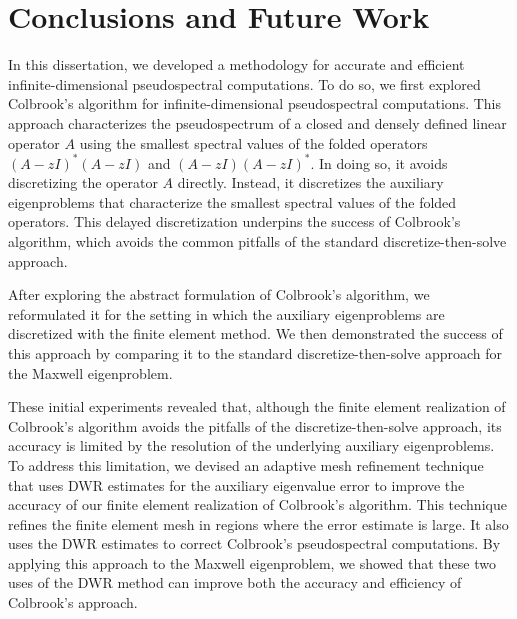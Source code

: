 \chapter{Conclusions and Future Work}


In this dissertation, we developed a methodology for accurate and efficient infinite-dimensional pseudospectral computations. To do so, we first explored Colbrook's algorithm for infinite-dimensional pseudospectral computations. This approach characterizes the pseudospectrum of a closed and densely defined linear operator $A$ using the smallest spectral values of the folded operators $(A-zI)^*(A-zI)$ and $(A-zI)(A-zI)^*.$ In doing so, it avoids discretizing the operator $A$ directly. Instead, it discretizes the auxiliary eigenproblems that characterize the smallest spectral values of the folded operators. This delayed discretization underpins the success of Colbrook's algorithm, which avoids the common pitfalls of the standard discretize-then-solve approach.

After exploring the abstract formulation of Colbrook's algorithm, we reformulated it for the setting in which the auxiliary eigenproblems are discretized with the finite element method. We then demonstrated the success of this approach by comparing it to the standard discretize-then-solve approach for the Maxwell eigenproblem. 




These initial experiments revealed that, although the finite element realization of Colbrook's algorithm avoids the pitfalls of the discretize-then-solve approach, its accuracy is limited by the resolution of the underlying auxiliary eigenproblems. 
To address this limitation, we devised an adaptive mesh refinement technique that uses DWR estimates for the auxiliary eigenvalue error to improve the accuracy of our finite element realization of Colbrook's algorithm. This technique refines the finite element mesh in regions where the error estimate is large. It also uses the DWR estimates to correct Colbrook's pseudospectral computations. By applying this approach to the Maxwell eigenproblem, we showed that these two uses of the DWR method can improve both the accuracy and efficiency of Colbrook's approach.

